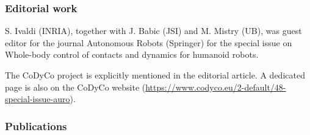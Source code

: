 \subsubsection{Editorial work}

S. Ivaldi (INRIA), together with J. Babic (JSI) and M. Mistry (UB), was guest editor for the journal Autonomous Robots (Springer) for the special issue on Whole-body control of contacts and dynamics for humanoid robots.

The CoDyCo project is explicitly mentioned in the editorial article. A dedicated page is also on the CoDyCo website (\url{https://www.codyco.eu/2-default/48-special-issue-auro}).


\subsubsection{Publications}

